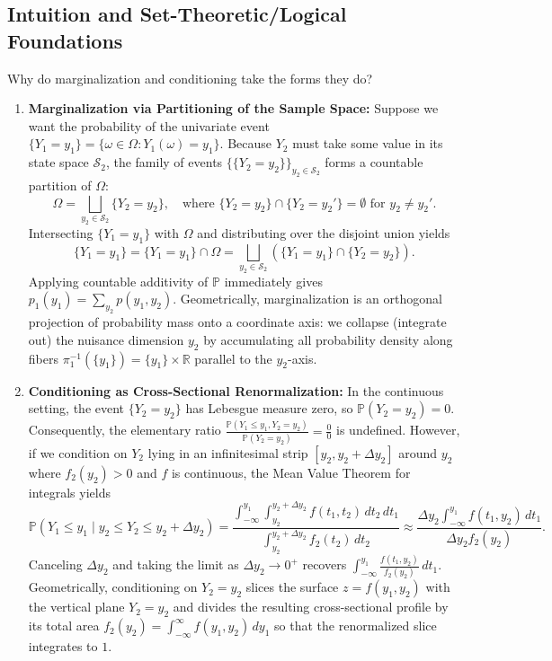 \documentclass[11pt, letterpaper]{article}
\theoremstyle{definition}
\theoremstyle{remark}
\newcommand{\Prob}{\mathbb{P}}
\begin{document}
\subsection{Intuition and Set-Theoretic/Logical Foundations}

Why do marginalization and conditioning take the forms they do?
\begin{enumerate}
    \item \textbf{Marginalization via Partitioning of the Sample Space:} Suppose we want the probability of the univariate event $\{Y_1 = y_1\} = \{\omega \in \Omega : Y_1(\omega) = y_1\}$. Because $Y_2$ must take some value in its state space $\mathcal{S}_2$, the family of events $\{\{Y_2 = y_2\}\}_{y_2 \in \mathcal{S}_2}$ forms a countable partition of $\Omega$:
    \[ \Omega = \bigsqcup_{y_2 \in \mathcal{S}_2} \{Y_2 = y_2\}, \quad \text{where } \{Y_2 = y_2\} \cap \{Y_2 = y_2'\} = \emptyset \text{ for } y_2 \neq y_2'. \]
    Intersecting $\{Y_1 = y_1\}$ with $\Omega$ and distributing over the disjoint union yields
    \[ \{Y_1 = y_1\} = \{Y_1 = y_1\} \cap \Omega = \bigsqcup_{y_2 \in \mathcal{S}_2} \left( \{Y_1 = y_1\} \cap \{Y_2 = y_2\} \right). \]
    Applying countable additivity of $\Prob$ immediately gives $p_1(y_1) = \sum_{y_2} p(y_1, y_2)$. Geometrically, marginalization is an orthogonal projection of probability mass onto a coordinate axis: we collapse (integrate out) the nuisance dimension $y_2$ by accumulating all probability density along fibers $\pi_1^{-1}(\{y_1\}) = \{y_1\} \times \mathbb{R}$ parallel to the $y_2$-axis.
    \item \textbf{Conditioning as Cross-Sectional Renormalization:} In the continuous setting, the event $\{Y_2 = y_2\}$ has Lebesgue measure zero, so $\Prob(Y_2 = y_2) = 0$. Consequently, the elementary ratio $\frac{\Prob(Y_1 \le y_1, Y_2 = y_2)}{\Prob(Y_2 = y_2)} = \frac{0}{0}$ is undefined. However, if we condition on $Y_2$ lying in an infinitesimal strip $[y_2, y_2 + \Delta y_2]$ around $y_2$ where $f_2(y_2) > 0$ and $f$ is continuous, the Mean Value Theorem for integrals yields
    \[ \Prob(Y_1 \le y_1 \mid y_2 \le Y_2 \le y_2 + \Delta y_2) = \frac{\int_{-\infty}^{y_1} \int_{y_2}^{y_2 + \Delta y_2} f(t_1, t_2) \, dt_2 \, dt_1}{\int_{y_2}^{y_2 + \Delta y_2} f_2(t_2) \, dt_2} \approx \frac{\Delta y_2 \int_{-\infty}^{y_1} f(t_1, y_2) \, dt_1}{\Delta y_2 f_2(y_2)}. \]
    Canceling $\Delta y_2$ and taking the limit as $\Delta y_2 \to 0^+$ recovers $\int_{-\infty}^{y_1} \frac{f(t_1, y_2)}{f_2(y_2)} \, dt_1$. Geometrically, conditioning on $Y_2 = y_2$ slices the surface $z = f(y_1, y_2)$ with the vertical plane $Y_2 = y_2$ and divides the resulting cross-sectional profile by its total area $f_2(y_2) = \int_{-\infty}^\infty f(y_1, y_2) \, dy_1$ so that the renormalized slice integrates to $1$.
\end{enumerate}
\end{document}
